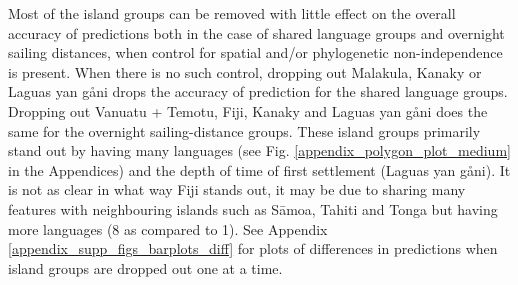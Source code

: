 \documentclass[unnumsec,webpdf,modern,medium]{oup-authoring-template}
\begin{document}

Most of the island groups can be removed with little effect on the overall accuracy of predictions both in the case of shared language groups and overnight sailing distances, when control for spatial and/or phylogenetic non-independence is present. When there is no such control, dropping out Malakula, Kanaky or Laguas yan gåni drops the accuracy of prediction for the shared language groups. Dropping out Vanuatu + Temotu, Fiji, Kanaky and Laguas yan gåni does the same for the overnight sailing-distance groups. These island groups primarily stand out by having many languages (see Fig. \ref{appendix_polygon_plot_medium} in the Appendices) and the depth of time of first settlement (Laguas yan gåni). It is not as clear in what way Fiji stands out, it may be due to sharing many features with neighbouring islands such as S\={a}moa, Tahiti and Tonga but having more languages (8 as compared to 1). See Appendix \ref{appendix_supp_figs_barplots_diff} for plots of differences in predictions when island groups are dropped out one at a time.



\end{document}
